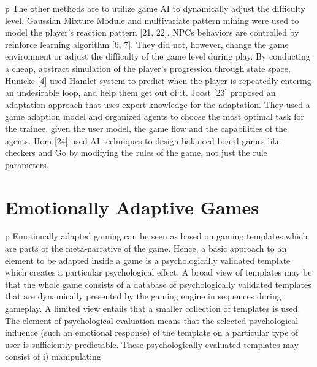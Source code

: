 p The other methods are to utilize game AI to dynamically adjust the difﬁculty level. Gaussian Mixture Module and multivariate pattern mining were used to model the player’s reaction pattern [21, 22]. NPCs behaviors are controlled by reinforce learning algorithm [6, 7]. They did not, however, change the game environment or adjust the difﬁculty of the game level during play. By conducting a cheap, abstract simulation of the player’s progression through state space, Hunicke [4] used Hamlet system to predict when the player is repeatedly entering an undesirable loop, and help them get out of it. Joost [23] proposed an adaptation approach that uses expert knowledge for the adaptation. They used a game adaption model and organized agents to choose the most optimal task for the trainee, given the user model, the game ﬂow and the capabilities of the agents. Hom [24] used AI techniques to design balanced board games like checkers and Go by modifying the rules of the game, not just the rule parameters.


\section{Emotionally Adaptive Games}


p Emotionally adapted gaming can be seen as based on gaming templates which are parts of the meta-narrative of the game. Hence, a basic approach to an element to be adapted inside a game is a psychologically validated template which creates a particular psychological effect. A broad view of templates may be that the whole game consists of a database of psychologically validated templates that are dynamically presented by the gaming engine in sequences during gameplay. A limited view entails that a smaller collection of templates is used. The element of psychological evaluation means that the selected psychological influence (such an emotional response) of the template on a particular type of user is sufficiently predictable. These psychologically evaluated templates may consist of i) manipulating 

